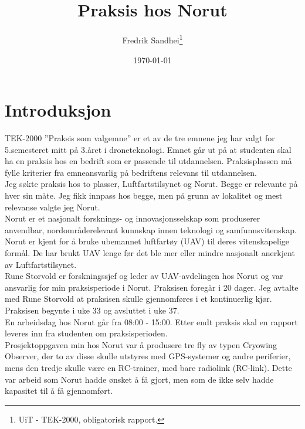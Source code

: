 \documentclass[12pt, a4paper]{report}
\begin{document}
\title{\\Praksis hos Norut}
\author{Fredrik Sandhei\thanks{UiT - TEK-2000, obligatorisk rapport.}}

\date{\today}
\maketitle
\newpage
\tableofcontents
\newpage

\section{Introduksjon}
TEK-2000 ''Praksis som valgemne'' er et av de tre emnene jeg har valgt for 5.semesteret mitt på 3.året i droneteknologi. Emnet går ut på at studenten skal ha en praksis hos en bedrift som er passende til utdannelsen. Praksisplassen må fylle kriterier fra emneansvarlig på bedriftens relevans til utdannelsen. \\


Jeg søkte praksis hos to plasser, Luftfartstilsynet og Norut. Begge er relevante på hver sin måte. Jeg fikk innpass hos begge, men på grunn av lokalitet og mest relevanse valgte jeg Norut.\\

Norut er et nasjonalt forsknings- og innovasjonsselskap som produserer anvendbar, nordområderelevant kunnskap innen teknologi og samfunnsvitenskap. Norut er kjent for å bruke ubemannet luftfartøy (UAV) til deres vitenskapelige formål. De har brukt UAV lenge før det ble mer eller mindre nasjonalt anerkjent av Luftfartstilsynet.\\


Rune Storvold er forskningssjef og leder av UAV-avdelingen hos Norut og var ansvarlig for min praksisperiode i Norut. Praksisen foregår i 20 dager. Jeg avtalte med Rune Storvold at praksisen skulle gjennomføres i et kontinuerlig kjør. Praksisen begynte i uke 33 og avsluttet i uke 37.\\


En arbeidsdag hos Norut går fra 08:00 - 15:00. Etter endt praksis skal en rapport leveres inn fra studenten om praksisperioden.\\
Prosjektoppgaven min hos Norut var å produsere tre fly av typen Cryowing Observer, der to av disse skulle utstyres med GPS-systemer og andre periferier, mens den tredje skulle være en RC-trainer, med bare radiolink (RC-link). Dette var arbeid som Norut hadde ønsket å få gjort, men som de ikke selv hadde kapasitet til å få gjennomført.\\ 
\end{document}
